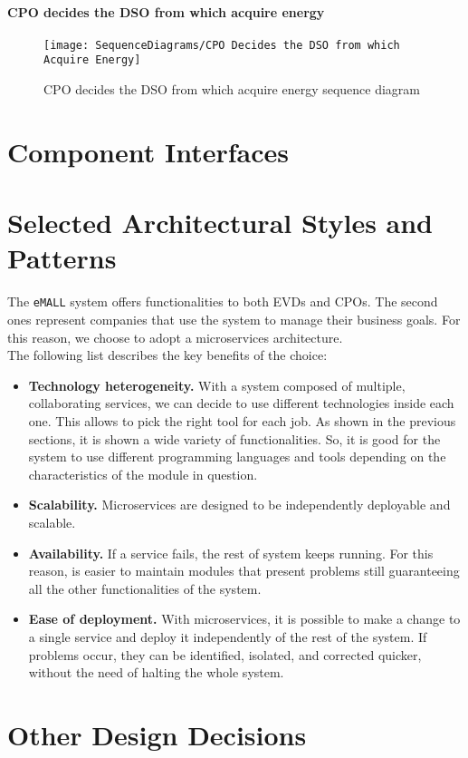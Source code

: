 \paragraph{CPO decides the DSO from which acquire energy}
\begin{figure}[H]
    \begin{center}
        \texttt{[image: SequenceDiagrams/CPO Decides the DSO from which Acquire Energy]}
        \caption{CPO decides the DSO from which acquire energy sequence diagram}
        \label{cpo_decides_dso_from_which_acquire_energy}
    \end{center}
\end{figure}


\section{Component Interfaces}
\label{sec: component_interfaces}%


\section{Selected Architectural Styles and Patterns}
\label{sec: patterns}%
The \verb|eMALL| system offers functionalities to both EVDs and CPOs.
The second ones represent companies that use the system to manage their business goals.
For this reason, we choose to adopt a microservices architecture. \\
The following list describes the key benefits of the choice:
\begin{itemize}
    \item \textbf{Technology heterogeneity.} With a system composed of multiple, collaborating services, we can decide to use different
    technologies inside each one.
    This allows to pick the right tool for each job.
    As shown in the previous sections, it is shown a wide variety of functionalities.
    So, it is good for the system to use different programming languages and tools depending on the characteristics of
    the module in question.
    \item \textbf{Scalability.} Microservices are designed to be independently deployable and scalable.
    \item \textbf{Availability.} If a service fails, the rest of system keeps running.
    For this reason, is easier to maintain modules that present problems still guaranteeing all the other functionalities
    of the system.
    \item \textbf{Ease of deployment.} With microservices, it is possible to make a change to a single service and deploy
    it independently of the rest of the system.
    If problems occur, they can be identified, isolated, and corrected quicker, without the need of halting the whole system.
\end{itemize}


\section{Other Design Decisions}
\label{sec: other_design_decisions}%

